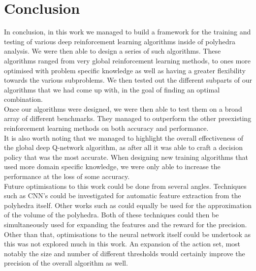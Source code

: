 
\chapter{Conclusion}

In conclusion, in this work we managed to build a framework for the training and testing of various deep reinforcement learning algorithms inside of polyhedra analysis. We were then able to design a series of such algorithms. These algorithms ranged from very global reinforcement learning methods, to ones more optimised with problem specific knowledge as well as having a greater flexibility towards the various subproblems. We then tested out the different subparts of our algorithms that we had come up with, in the goal of finding an optimal combination.\\
Once our algorithms were designed, we were then able to test them on a broad array of different benchmarks. They managed to outperform the other preexisting reinforcement learning methods on both accuracy and performance.\\
It is also worth noting that we managed to highlight the overall effectiveness of the global deep Q-network algorithm, as after all it was able to craft a decision policy that was the most accurate. When designing new training algorithms that used more domain specific knowledge, we were only able to increase the performance at the loss of some accuracy.\\
Future optimisations to this work could be done from several angles. Techniques such as CNN's could be investigated for automatic feature extraction from the polyhedra itself. Other works such as \cite{dyer1991random, kim2004fast} could equally be used for the approximation of the volume of the polyhedra. Both of these techniques could then be simultaneously used for expanding the features and the reward for the precision. Other than that, optimisations to the neural network itself could be undertook as this was not explored much in this work. An expansion of the action set, most notably the size and number of different thresholds would certainly improve the precision of the overall algorithm as well.
